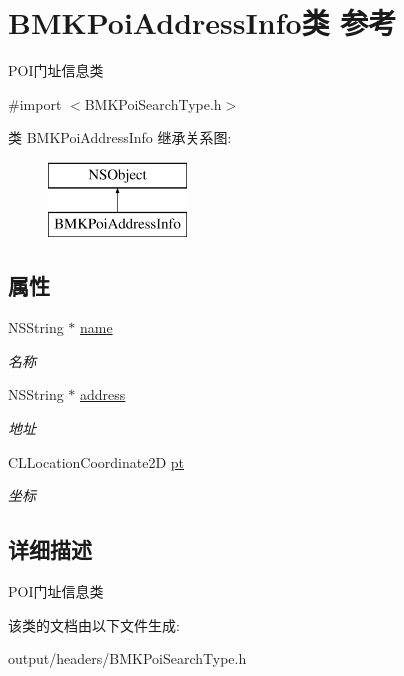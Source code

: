 \hypertarget{interface_b_m_k_poi_address_info}{}\section{B\+M\+K\+Poi\+Address\+Info类 参考}
\label{interface_b_m_k_poi_address_info}


P\+O\+I门址信息类  




{\ttfamily \#import $<$B\+M\+K\+Poi\+Search\+Type.\+h$>$}

类 B\+M\+K\+Poi\+Address\+Info 继承关系图\+:\begin{figure}[H]
\begin{center}
\leavevmode
\includegraphics[height=2.000000cm]{interface_b_m_k_poi_address_info}
\end{center}
\end{figure}
\subsection*{属性}
\begin{DoxyCompactItemize}
\item 
\hypertarget{interface_b_m_k_poi_address_info_a5a85711d046069270d6d2e4e1a45cdfc}{}N\+S\+String $\ast$ \hyperlink{interface_b_m_k_poi_address_info_a5a85711d046069270d6d2e4e1a45cdfc}{name}\label{interface_b_m_k_poi_address_info_a5a85711d046069270d6d2e4e1a45cdfc}

\begin{DoxyCompactList}\small\item\em 名称 \end{DoxyCompactList}\item 
\hypertarget{interface_b_m_k_poi_address_info_ac3795e28eaa1194d7abf8a6471e6527c}{}N\+S\+String $\ast$ \hyperlink{interface_b_m_k_poi_address_info_ac3795e28eaa1194d7abf8a6471e6527c}{address}\label{interface_b_m_k_poi_address_info_ac3795e28eaa1194d7abf8a6471e6527c}

\begin{DoxyCompactList}\small\item\em 地址 \end{DoxyCompactList}\item 
\hypertarget{interface_b_m_k_poi_address_info_adcb69c80be56b4ea7c5b483ffb079eee}{}C\+L\+Location\+Coordinate2\+D \hyperlink{interface_b_m_k_poi_address_info_adcb69c80be56b4ea7c5b483ffb079eee}{pt}\label{interface_b_m_k_poi_address_info_adcb69c80be56b4ea7c5b483ffb079eee}

\begin{DoxyCompactList}\small\item\em 坐标 \end{DoxyCompactList}\end{DoxyCompactItemize}


\subsection{详细描述}
P\+O\+I门址信息类 

该类的文档由以下文件生成\+:\begin{DoxyCompactItemize}
\item 
output/headers/B\+M\+K\+Poi\+Search\+Type.\+h\end{DoxyCompactItemize}
